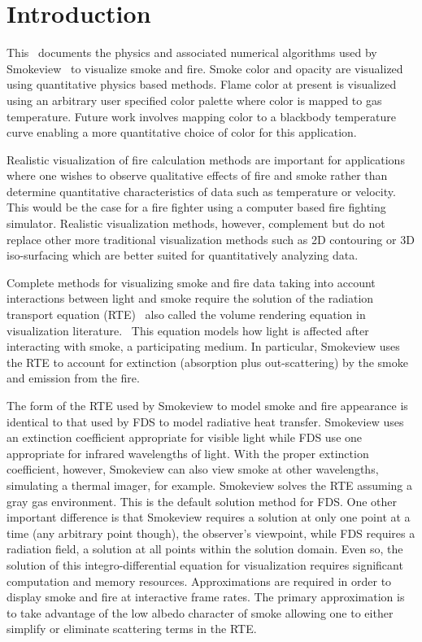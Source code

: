 


\section{Introduction}
This \paper\ documents the physics and associated numerical
algorithms used by Smokeview~\cite{Smokeview_Users_Guide} to
visualize smoke and fire.  Smoke color and opacity are visualized
using quantitative physics based methods.  Flame color at present
is visualized using an arbitrary user specified color palette
where color is mapped to gas temperature. Future work involves
mapping color to a blackbody temperature curve enabling a more
quantitative choice of color for this application.

Realistic visualization of fire calculation methods are important
for applications where one wishes to observe qualitative effects
of fire and smoke rather than determine quantitative
characteristics of data such as temperature or velocity.  This
would be the case for a fire fighter using a computer based fire
fighting simulator. Realistic visualization methods, however,
complement but do not replace other more traditional visualization
methods such as 2D contouring or 3D iso-surfacing which are better
suited for quantitatively analyzing data.

Complete methods for visualizing smoke and fire data taking into
account interactions between light and smoke require the solution
of the radiation transport equation (RTE)~\cite{Siegel:2001} also
called the volume rendering equation in visualization
literature.~\cite{levoy:1988} This equation models how light is
affected after interacting with smoke, a participating medium. In
particular, Smokeview uses the RTE to account for extinction
(absorption plus out-scattering) by the smoke and emission from
the fire.

The form of the RTE used by Smokeview to model smoke and fire
appearance is identical to that used by FDS to model radiative
heat transfer. Smokeview uses an extinction coefficient
appropriate for visible light while FDS use one appropriate for
infrared wavelengths of light.  With the proper extinction
coefficient, however, Smokeview can also view smoke at other
wavelengths, simulating a thermal imager, for example. Smokeview
solves the RTE assuming a gray gas environment. This is the
default solution method for FDS. One other important difference is
that Smokeview requires a solution at only one point at a time
(any arbitrary point though), the observer's viewpoint, while FDS
requires a radiation field, a solution at all points within the
solution domain.  Even so, the solution of this
integro-differential equation for visualization requires
significant computation and memory  resources. Approximations are
required in order to display smoke and fire at interactive frame
rates.  The primary approximation is to take advantage of the low
albedo character of smoke allowing one to either simplify or
eliminate scattering terms in the RTE.

